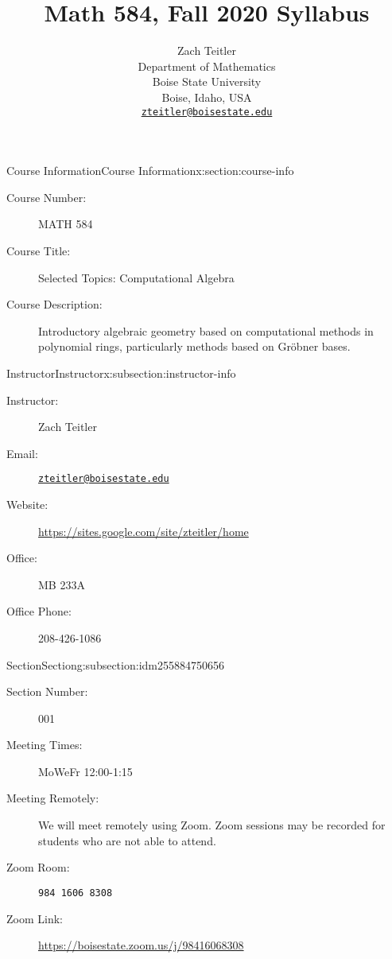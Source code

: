 \documentclass[oneside,10pt,]{article}
\title{Math 584, Fall 2020 Syllabus}
\author{Zach Teitler\\
Department of Mathematics\\
Boise State University\\
Boise, Idaho, USA\\
\href{mailto:zteitler@boisestate.edu}{\nolinkurl{zteitler@boisestate.edu}}
}
\date{}
\newcommand{\mono}[1]{\texttt{#1}}
\begin{document}
\hypertarget{x:article:zteitler-2020C-584-syllabus}{}
\maketitle
\thispagestyle{empty}
%
%
\typeout{************************************************}
\typeout{************************************************}
%
\begin{sectionptx}{Course Information}{}{Course Information}{}{}{x:section:course-info}
\begin{introduction}{}%
%
\begin{description}
\item[{Course Number:}]MATH 584%
\item[{Course Title:}]Selected Topics: Computational Algebra%
\item[{Course Description:}]Introductory algebraic geometry based on computational methods in polynomial rings, particularly methods based on Gröbner bases.%
\end{description}
%
\end{introduction}%
%
%
\typeout{************************************************}
\typeout{************************************************}
%
\begin{subsectionptx}{Instructor}{}{Instructor}{}{}{x:subsection:instructor-info}
%
\begin{description}
\item[{Instructor:}]Zach Teitler%
\item[{Email:}]\href{mailto:zteitler@boisestate.edu}{\nolinkurl{zteitler@boisestate.edu}}%
\item[{Website:}]\url{https://sites.google.com/site/zteitler/home}%
\item[{Office:}]MB 233A%
\item[{Office Phone:}]208-426-1086%
\end{description}
%
\end{subsectionptx}
%
%
\typeout{************************************************}
\typeout{************************************************}
%
\begin{subsectionptx}{Section}{}{Section}{}{}{g:subsection:idm255884750656}
%
\begin{description}
\item[{Section Number:}]001%
\item[{Meeting Times:}]MoWeFr 12:00-1:15%
\item[{Meeting Remotely:}]We will meet remotely using Zoom. Zoom sessions may be recorded for students who are not able to attend.%
\item[{Zoom Room:}]\mono{984 1606 8308}%
\item[{Zoom Link:}]\url{https://boisestate.zoom.us/j/98416068308}%
\end{description}
%
\end{subsectionptx}
\end{sectionptx}
\end{document}
